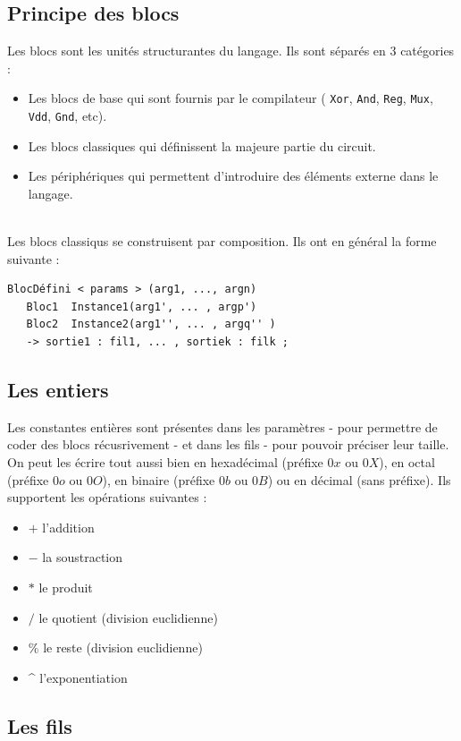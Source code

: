\documentclass[13pt]{article}
\begin{document}
\subsection{Principe des blocs}
Les blocs sont les unités structurantes du langage. Ils sont séparés en 3
catégories :
\begin{itemize}
\item Les blocs de base qui sont fournis par le compilateur ( \texttt{Xor}, \texttt{And}, \texttt{Reg},
  \texttt{Mux}, \texttt{Vdd}, \texttt{Gnd}, etc).
\item Les blocs classiques qui définissent la majeure partie du circuit.
\item Les périphériques qui permettent d'introduire des éléments externe dans le langage.
\end{itemize}
\text{}\\
Les blocs classiqus se construisent par composition. Ils ont en général la forme
suivante : 
\begin{verbatim}
BlocDéfini < params > (arg1, ..., argn)
   Bloc1  Instance1(arg1', ... , argp')
   Bloc2  Instance2(arg1'', ... , argq'' )
   -> sortie1 : fil1, ... , sortiek : filk ;
\end{verbatim}


\subsection{Les entiers} 
Les constantes entières sont présentes dans les paramètres - pour permettre de
coder des blocs récusrivement - et dans les fils - pour pouvoir préciser leur taille.
\text{}\\

On peut les écrire tout aussi bien en hexadécimal (préfixe \og $0x$\fg{} ou \og $0X$\fg{}), en
octal (préfixe \og $0o$\fg{} ou \og $0O$\fg{}), en binaire (préfixe \og $0b$ \og
ou \og $0B$\fg{}) ou en décimal (sans préfixe).
Ils supportent les opérations suivantes :
\begin{itemize}
\item $+$ l'addition
\item $-$ la soustraction
\item $*$ le produit
\item $/$ le quotient (division euclidienne)
\item $\%$ le reste (division euclidienne)
\item \^{} l'exponentiation
\end{itemize}


\subsection{Les fils}
\end{document}
